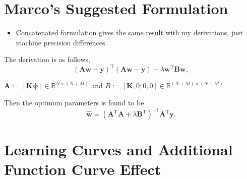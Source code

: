 \documentclass{tran-l}
\theoremstyle{definition}
\theoremstyle{remark}
\numberwithin{equation}{section}
\newcommand{\mR}{\mathbb{R}}
\begin{document}
\section{Marco's Suggested Formulation}

\begin{itemize}
  \item Concatenated formulation gives the same result with my derivations, just machine precision differences.
\end{itemize}

The derivation is as follows,
\begin{equation}
  (\mathbf{A}\mathbf{w}-\mathbf{y})^\text{T}(\mathbf{A}\mathbf{w}-\mathbf{y}) + \lambda\mathbf{w}^\text{T}\mathbf{B}\mathbf{w},
\end{equation}

$\mathbf{A}:=[\mathbf{K}\boldsymbol{\psi}]\in \mR^{N\times(N+M)}$ and $B:=[\mathbf{K},0;0,0] \in \mR^{(N+M)\times(N+M)}$

Then the optimum parameters is found to be
\begin{equation}
  \hat{\mathbf{w}}=(\mathbf{A}^\text{T}\mathbf{A} + \lambda \mathbf{B}^\text{T})^{-1}\mathbf{A}^\text{T}\mathbf{y}.
\end{equation}


\section{Learning Curves and Additional Function Curve Effect}
\end{document}
